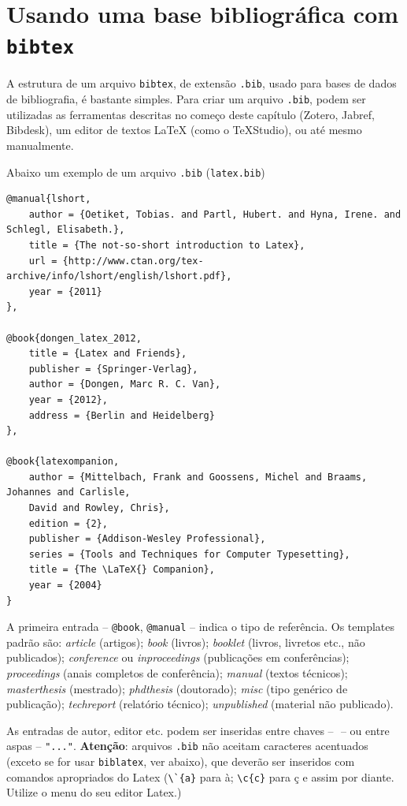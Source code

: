 \section{Usando uma base bibliográfica com \texttt{bibtex}}
\label{bibtex}

A estrutura de um arquivo \texttt{bibtex}, de extensão \texttt{.bib}, usado para bases de dados de bibliografia, é bastante simples. Para criar um arquivo \texttt{.bib}, podem ser utilizadas as ferramentas descritas no começo deste capítulo (Zotero, Jabref, Bibdesk), um editor de textos \LaTeX{} (como o TeXStudio), ou até mesmo manualmente.

Abaixo um exemplo de um arquivo \texttt{.bib} (\texttt{latex.bib}) \label{latex-bib}

\begin{verbatim}
@manual{lshort,
    author = {Oetiket, Tobias. and Partl, Hubert. and Hyna, Irene. and Schlegl, Elisabeth.},
    title = {The not-so-short introduction to Latex},
    url = {http://www.ctan.org/tex-archive/info/lshort/english/lshort.pdf},
    year = {2011}
},

@book{dongen_latex_2012,
	title = {Latex and Friends},
	publisher = {Springer-Verlag},
	author = {Dongen, Marc R. C. Van},
	year = {2012},
	address = {Berlin and Heidelberg}
},

@book{latexompanion,
    author = {Mittelbach, Frank and Goossens, Michel and Braams, Johannes and Carlisle, 
    David and Rowley, Chris},
    edition = {2},
    publisher = {Addison-Wesley Professional},
    series = {Tools and Techniques for Computer Typesetting},
    title = {The \LaTeX{} Companion},
    year = {2004}
}

\end{verbatim}

A primeira entrada -- \verb+@book+, \verb+@manual+ -- indica o tipo de referência. Os templates padrão são: \textit{article} (artigos); \textit{book} (livros); \textit{booklet} (livros, livretos etc., não publicados); \textit{conference} ou \textit{inproceedings} (publicações em conferências); \textit{proceedings} (anais completos de conferência); \textit{manual} (textos técnicos); \textit{masterthesis} (mestrado); \textit{phdthesis} (doutorado); \textit{misc} (tipo genérico de publicação); \textit{techreport} (relatório técnico); \textit{unpublished} (material não publicado).

As entradas de autor, editor etc. podem ser inseridas entre chaves -- ${}$ -- ou entre aspas -- \verb+"..."+. 
\textbf{Atenção}: arquivos \texttt{.bib} não aceitam caracteres acentuados (exceto se for usar \texttt{biblatex}, ver abaixo), que deverão ser inseridos com comandos apropriados do Latex (\verb+\`{a}+ para à; \verb+\c{c}+ para ç e assim por diante. Utilize o menu do seu editor Latex.)


